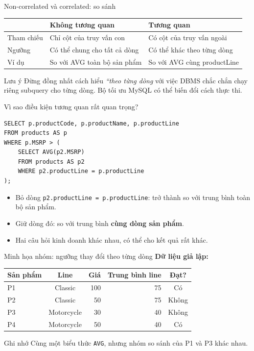 \documentclass[aspectratio=169,10pt]{beamer}
\newcommand{\code}[1]{\texttt{#1}}
\begin{document}
\begin{frame}[fragile]{Non-correlated và correlated: so sánh}
\small
\begin{tabularx}{\linewidth}{l X X}\toprule
 & Không tương quan & Tương quan\\\midrule
Tham chiếu & Chỉ cột của truy vấn con & Có cột của truy vấn ngoài\\
Ngưỡng & Có thể chung cho tất cả dòng & Có thể khác theo từng dòng\\
Ví dụ & So với AVG toàn bộ sản phẩm & So với AVG cùng productLine\\\bottomrule
\end{tabularx}
\vspace{.7em}
\begin{alertblock}{Lưu ý}
\small Đừng đồng nhất cách hiểu \emph{``theo từng dòng} với việc DBMS chắc chắn chạy riêng subquery cho từng dòng. Bộ tối ưu MySQL có thể biến đổi cách thực thi.
\end{alertblock}
\end{frame}

\begin{frame}[fragile]{Vì sao điều kiện tương quan rất quan trọng?}
\begin{lstlisting}
SELECT p.productCode, p.productName, p.productLine
FROM products AS p
WHERE p.MSRP > (
    SELECT AVG(p2.MSRP)
    FROM products AS p2
    WHERE p2.productLine = p.productLine
);
\end{lstlisting}
\begin{itemize}
\item Bỏ dòng \code{p2.productLine = p.productLine}: trở thành so với trung bình toàn bộ sản phẩm.
\item Giữ dòng đó: so với trung bình \textbf{cùng dòng sản phẩm}.
\item Hai câu hỏi kinh doanh khác nhau, có thể cho kết quả rất khác.
\end{itemize}
\end{frame}

\begin{frame}[fragile]{Minh họa nhóm: ngưỡng thay đổi theo từng dòng}
\small \textbf{Dữ liệu giả lập:}
\begin{center}
\begin{tabular}{l c r r c}\toprule
Sản phẩm & Line & Giá & Trung bình line & Đạt?\\\midrule
P1 & Classic & 100 & 75 & Có\\
P2 & Classic & 50 & 75 & Không\\
P3 & Motorcycle & 30 & 40 & Không\\
P4 & Motorcycle & 50 & 40 & Có\\\bottomrule
\end{tabular}
\end{center}
\vspace{.2em}
\begin{block}{Ghi nhớ}
\small Cùng một biểu thức \code{AVG}, nhưng nhóm so sánh của P1 và P3 khác nhau.
\end{block}
\end{frame}
\end{document}
